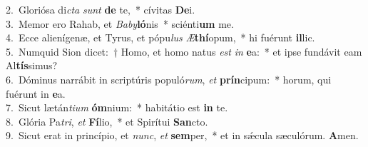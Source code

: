 {2.~}Gloriósa di\textit{cta} \textit{sunt} \textbf{de} te,~* cívitas \textbf{De}i.\\
{3.~}Memor ero Rahab, et \textit{Ba}\textit{by}\textbf{ló}nis~* sciénti\textbf{um} me.\\
{4.~}Ecce alienígenæ, et Tyrus, et pópu\textit{lus} \textit{Æ}\textbf{thí}opum,~* hi fuérunt \textbf{il}lic.\\
{5.~}Numquid Sion dicet:~† Homo, et homo natus \textit{est} \textit{in} \textbf{e}a:~* et ipse fundávit eam Al\textbf{tís}simus?\\
{6.~}Dóminus narrábit in scriptúris populó\textit{rum}, \textit{et} \textbf{prín}cipum:~* horum, qui fuérunt in \textbf{e}a.\\
{7.~}Sicut lætán\textit{ti}\textit{um} \textbf{óm}nium:~* habitátio est \textbf{in} te.\\
{8.~}Glória Pa\textit{tri}, \textit{et} \textbf{Fí}lio,~* et Spirítui \textbf{San}cto.\\
{9.~}Sicut erat in princípio, et \textit{nunc}, \textit{et} \textbf{sem}per,~* et in sǽcula sæculórum. \textbf{A}men.\\
